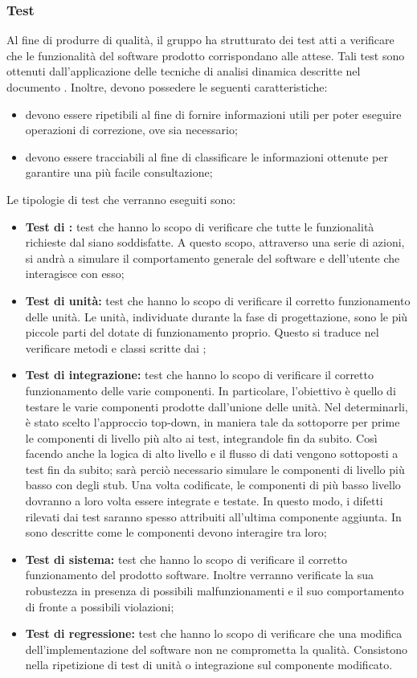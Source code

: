 \documentclass[PdQ.tex]{subfiles}
\begin{document}
\subsubsection{Test}
Al fine di produrre  di qualità, il gruppo ha strutturato dei test atti a verificare che le funzionalità del software prodotto corrispondano alle attese.
Tali test sono ottenuti dall'applicazione delle tecniche di analisi dinamica descritte nel documento \NPdocRP{}. Inoltre, devono possedere le seguenti caratteristiche:
\begin{itemize}
	\item devono essere ripetibili al fine di fornire informazioni utili per poter eseguire operazioni di correzione, ove sia necessario;
	\item devono essere tracciabili al fine di classificare le informazioni ottenute per garantire una più facile consultazione;
\end{itemize}
Le tipologie di test che verranno eseguiti sono:
\begin{itemize}
\item \textbf{Test di :} test che hanno lo scopo di verificare che tutte le funzionalità richieste dal  siano soddisfatte. A questo scopo, attraverso una serie di
azioni, si andrà a simulare il comportamento generale del software e dell'utente che interagisce con esso;
\item \textbf{Test di unità: } test che  hanno lo scopo di verificare il corretto funzionamento delle unità. Le unità, individuate durante la fase di progettazione, sono le
		più piccole parti del  dotate di funzionamento proprio. Questo si traduce nel verificare metodi e classi scritte dai \PRP{};
\item \textbf{Test di integrazione: } test che hanno lo scopo di verificare il corretto funzionamento delle varie componenti. In particolare, l'obiettivo è quello di testare le varie componenti prodotte dall'unione delle unità. Nel determinarli, è stato scelto l'approccio top-down, in maniera tale da sottoporre per prime le componenti di livello più alto ai test, integrandole fin da subito. Così facendo anche la logica di alto livello e il flusso di dati vengono sottoposti a test fin da subito; sarà perciò necessario simulare le componenti di livello più basso con degli stub. Una volta codificate, le componenti di più basso livello dovranno a loro volta essere
integrate e testate. In questo modo, i difetti rilevati dai test saranno spesso attribuiti all'ultima componente aggiunta. In \DPdoc{} sono descritte come le componenti devono interagire tra loro;
\item \textbf{Test di sistema: }test che hanno lo scopo di verificare il corretto funzionamento del prodotto software. Inoltre verranno verificate la sua robustezza in presenza di
		possibili malfunzionamenti e il suo comportamento di fronte a possibili violazioni;
\item \textbf{Test di regressione: } test che hanno lo scopo di verificare che una modifica dell'implementazione del software non ne comprometta la qualità. Consistono nella ripetizione di test di unità o integrazione sul componente modificato.			
\end{itemize}
\end{document}
